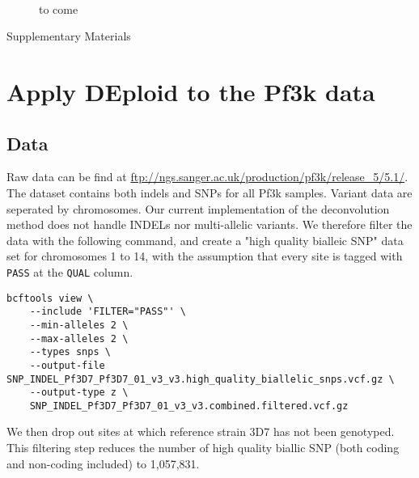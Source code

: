 \documentclass{article}
\begin{document}
\begin{figure}[h]
\centering
{}\\

\caption{to come}

\end{figure}





\newpage

\begin{center}
\LARGE
Supplementary Materials
\end{center}



\section{Apply DEploid to the Pf3k data}
\subsection{Data}
Raw data can be find at \url{ftp://ngs.sanger.ac.uk/production/pf3k/release_5/5.1/}. The dataset contains both indels and SNPs for all Pf3k samples. Variant data are seperated by chromosomes. Our current implementation of the deconvolution method \citep{Zhu2017} does not handle INDELs nor multi-allelic variants. We therefore filter the data with the following command, and create a "high quality bialleic SNP" data set for chromosomes 1 to 14, with the assumption that every site is tagged with {\tt PASS} at the {\tt QUAL} column.
\linespread{1}
\begin{lstlisting}
bcftools view \
    --include 'FILTER="PASS"' \
    --min-alleles 2 \
    --max-alleles 2 \
    --types snps \
    --output-file SNP_INDEL_Pf3D7_Pf3D7_01_v3_v3.high_quality_biallelic_snps.vcf.gz \
    --output-type z \
    SNP_INDEL_Pf3D7_Pf3D7_01_v3_v3.combined.filtered.vcf.gz
\end{lstlisting}
\linespread{1.5}

We then drop out sites at which reference strain 3D7 has not been genotyped. This filtering step reduces the number of high quality biallic SNP (both coding and non-coding included) to 1,057,831.
\end{document}

